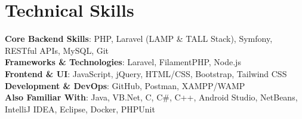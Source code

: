 \documentclass[legal,10pt]{article}
\newcommand{\resumeItem}[1]{
  \item\small{
    {#1 \vspace{-2pt}}
  }
}
\newcommand{\resumeItemListStart}{\begin{itemize}}
\newcommand{\resumeItemListEnd}{\end{itemize}\vspace{-5pt}}
\begin{document}
\section{Technical Skills}
\begin{itemize}[leftmargin=0.15in, label={}]
    \small{\item{
     \textbf{Core Backend Skills}{: PHP, Laravel (LAMP \& TALL Stack), Symfony, RESTful APIs, MySQL, Git} \\
     \textbf{Frameworks \& Technologies}{: Laravel, FilamentPHP, Node.js} \\
     \textbf{Frontend \& UI}{: JavaScript, jQuery, HTML/CSS, Bootstrap, Tailwind CSS} \\
     \textbf{Development \& DevOps}{: GitHub, Postman, XAMPP/WAMP} \\
     \textbf{Also Familiar With}{: Java, VB.Net, C, C\#, C++, Android Studio, NetBeans, IntelliJ IDEA, Eclipse, Docker, PHPUnit} \\
    }}
\end{itemize}

\end{document}
